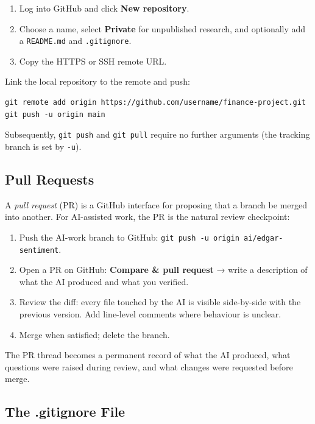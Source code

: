 \begin{enumerate}
  \item Log into GitHub and click \textbf{New repository}.
  \item Choose a name, select \textbf{Private} for unpublished research, and
        optionally add a \texttt{README.md} and \texttt{.gitignore}.
  \item Copy the HTTPS or SSH remote URL.
\end{enumerate}

Link the local repository to the remote and push:

\begin{verbatim}
git remote add origin https://github.com/username/finance-project.git
git push -u origin main
\end{verbatim}

Subsequently, \texttt{git push} and \texttt{git pull} require no further
arguments (the tracking branch is set by \texttt{-u}).

\subsection{Pull Requests}
\label{app:git:pr}

A \emph{pull request} (PR) is a GitHub interface for proposing that a branch
be merged into another.  For AI-assisted work, the PR is the natural review
checkpoint:

\begin{enumerate}
  \item Push the AI-work branch to GitHub: \texttt{git push -u origin ai/edgar-sentiment}.
  \item Open a PR on GitHub: \textbf{Compare \& pull request} → write a
        description of what the AI produced and what you verified.
  \item Review the diff: every file touched by the AI is visible side-by-side
        with the previous version.  Add line-level comments where behaviour is
        unclear.
  \item Merge when satisfied; delete the branch.
\end{enumerate}

The PR thread becomes a permanent record of what the AI produced, what questions
were raised during review, and what changes were requested before merge.

\subsection{The .gitignore File}
\label{app:git:gitignore}

